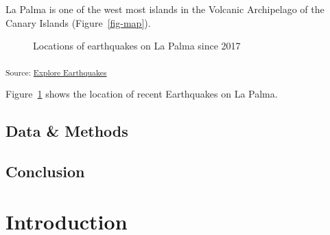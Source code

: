 \documentclass[11pt,a4paper]{report}
\begin{document}
La Palma is one of the west most islands in the Volcanic Archipelago of
the Canary Islands (Figure~\ref{fig-map}).

\begin{figure}[H]


\caption{\label{fig-spatial-plot}Locations of earthquakes on La Palma
since 2017}

\end{figure}%

\textsubscript{Source:
\href{https://VJMeyer.github.io/submission/notebooks/explore-earthquakes-preview.html\#cell-fig-spatial-plot}{Explore
Earthquakes}}

Figure~\ref{fig-spatial-plot} shows the location of recent Earthquakes
on La Palma.

\subsection{Data \& Methods}\label{sec-data-methods}

\subsection{Conclusion}\label{conclusion-1}

\section{Introduction}\label{introduction-2}
\end{document}

